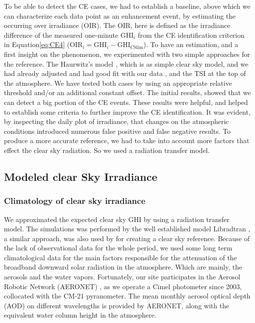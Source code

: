 \documentclass[preprint, 3p,
authoryear]{elsarticle} %
\begin{document}
To be able to detect the CE cases, we had to establish a baseline, above
which we can characterize each data point as an enhancement event, by
estimating the occurring over irradiance (OIR). The OIR, here is defined
as the irradiance difference of the measured one-minute \(\text{GHI}_i\)
from the CE identification criterion in
Equation\nobreakspace\ref{eq:CE4}
(\(\text{OIR}_i = \text{GHI}_i - \text{GHI}_\text{CSlim}\)). To have an
estimation, and a first insight on the phenomenon, we experimented with
two simple approaches for the reference. The Haurwitz's model
\citep{Haurwitz1945}, which is as simple clear sky model, and we had
already adjusted and had good fit with our data \citep{Natsis2023}, and
the TSI at the top of the atmosphere. We have tested both cases by using
an appropriate relative threshold and/or an additional constant offset.
The initial results, showed that we can detect a big portion of the CE
events. These results were helpful, and helped to establish some
criteria to further improve the CE identification. It was evident, by
inspecting the daily plot of irradiance, that changes on the atmospheric
conditions introduced numerous false positive and false negative
results. To produce a more accurate reference, we had to take into
account more factors that effect the clear sky radiation. So we used a
radiation transfer model.

\hypertarget{modeled-clear-sky-irradiance}{%
\subsection{Modeled clear Sky
Irradiance}\label{modeled-clear-sky-irradiance}}

\hypertarget{climatology-of-clear-sky-irradiance}{%
\subsubsection{Climatology of clear sky
irradiance}\label{climatology-of-clear-sky-irradiance}}

We approximated the expected clear sky GHI by using a radiation transfer
model. The simulations was performed by the well established model
Libradtran \citep{Emde2016}, a similar approach, was also used by
\citet{Vamvakas2020} for creating a clear sky reference. Because of the
lack of observational data for the whole period, we used some long term
climatological data for the main factors responsible for the attenuation
of the broadband downward solar radiation in the atmosphere. Which are
mainly, the aerosols and the water vapors. Fortunately, our site
participates in the Aerosol Robotic Network (AERONET)
\citep{Giles2019, Buis1998}, as we operate a Cimel photometer since
2003, collocated with the CM-21 pyranometer. The mean monthly aerosol
optical depth (AOD) on different wavelengths is provided by AERONET,
along with the equivalent water column height in the atmosphere.
\end{document}
